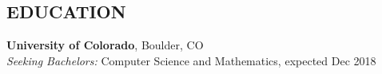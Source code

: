 \documentclass[margin]{res}
\begin{document}
\begin{resume}
\section{EDUCATION}
\textbf{University of Colorado}, Boulder, CO\\
{\sl Seeking Bachelors:} Computer Science and Mathematics, expected Dec 2018\hfill \\
\end{resume}
\end{document}
